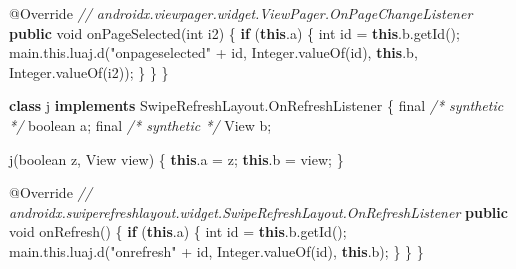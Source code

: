 \documentclass[
]{article}
\newenvironment{Shaded}{}{}
\newcommand{\AttributeTok}[1]{\textcolor[rgb]{0.49,0.56,0.16}{#1}}
\newcommand{\BuiltInTok}[1]{\textcolor[rgb]{0.00,0.50,0.00}{#1}}
\newcommand{\CommentTok}[1]{\textcolor[rgb]{0.38,0.63,0.69}{\textit{#1}}}
\newcommand{\ControlFlowTok}[1]{\textcolor[rgb]{0.00,0.44,0.13}{\textbf{#1}}}
\newcommand{\DataTypeTok}[1]{\textcolor[rgb]{0.56,0.13,0.00}{#1}}
\newcommand{\FunctionTok}[1]{\textcolor[rgb]{0.02,0.16,0.49}{#1}}
\newcommand{\KeywordTok}[1]{\textcolor[rgb]{0.00,0.44,0.13}{\textbf{#1}}}
\newcommand{\NormalTok}[1]{#1}
\newcommand{\OperatorTok}[1]{\textcolor[rgb]{0.40,0.40,0.40}{#1}}
\newcommand{\StringTok}[1]{\textcolor[rgb]{0.25,0.44,0.63}{#1}}
\begin{document}
\begin{Shaded}
\begin{Highlighting}[]
        \AttributeTok{@Override} \CommentTok{// androidx.viewpager.widget.ViewPager.OnPageChangeListener}
        \KeywordTok{public} \DataTypeTok{void} \FunctionTok{onPageSelected}\OperatorTok{(}\DataTypeTok{int}\NormalTok{ i2}\OperatorTok{)} \OperatorTok{\{}
            \ControlFlowTok{if} \OperatorTok{(}\KeywordTok{this}\OperatorTok{.}\FunctionTok{a}\OperatorTok{)} \OperatorTok{\{}
                \DataTypeTok{int}\NormalTok{ id }\OperatorTok{=} \KeywordTok{this}\OperatorTok{.}\FunctionTok{b}\OperatorTok{.}\FunctionTok{getId}\OperatorTok{();}
\NormalTok{                main}\OperatorTok{.}\FunctionTok{this}\OperatorTok{.}\FunctionTok{luaj}\OperatorTok{.}\FunctionTok{d}\OperatorTok{(}\StringTok{"onpageselected"} \OperatorTok{+}\NormalTok{ id}\OperatorTok{,} \BuiltInTok{Integer}\OperatorTok{.}\FunctionTok{valueOf}\OperatorTok{(}\NormalTok{id}\OperatorTok{),} \KeywordTok{this}\OperatorTok{.}\FunctionTok{b}\OperatorTok{,} \BuiltInTok{Integer}\OperatorTok{.}\FunctionTok{valueOf}\OperatorTok{(}\NormalTok{i2}\OperatorTok{));}
            \OperatorTok{\}}
        \OperatorTok{\}}
    \OperatorTok{\}}

    \KeywordTok{class}\NormalTok{ j }\KeywordTok{implements}\NormalTok{ SwipeRefreshLayout}\OperatorTok{.}\FunctionTok{OnRefreshListener} \OperatorTok{\{}
        \DataTypeTok{final} \CommentTok{/* synthetic */} \DataTypeTok{boolean}\NormalTok{ a}\OperatorTok{;}
        \DataTypeTok{final} \CommentTok{/* synthetic */} \BuiltInTok{View}\NormalTok{ b}\OperatorTok{;}

        \FunctionTok{j}\OperatorTok{(}\DataTypeTok{boolean}\NormalTok{ z}\OperatorTok{,} \BuiltInTok{View}\NormalTok{ view}\OperatorTok{)} \OperatorTok{\{}
            \KeywordTok{this}\OperatorTok{.}\FunctionTok{a} \OperatorTok{=}\NormalTok{ z}\OperatorTok{;}
            \KeywordTok{this}\OperatorTok{.}\FunctionTok{b} \OperatorTok{=}\NormalTok{ view}\OperatorTok{;}
        \OperatorTok{\}}

        \AttributeTok{@Override} \CommentTok{// androidx.swiperefreshlayout.widget.SwipeRefreshLayout.OnRefreshListener}
        \KeywordTok{public} \DataTypeTok{void} \FunctionTok{onRefresh}\OperatorTok{()} \OperatorTok{\{}
            \ControlFlowTok{if} \OperatorTok{(}\KeywordTok{this}\OperatorTok{.}\FunctionTok{a}\OperatorTok{)} \OperatorTok{\{}
                \DataTypeTok{int}\NormalTok{ id }\OperatorTok{=} \KeywordTok{this}\OperatorTok{.}\FunctionTok{b}\OperatorTok{.}\FunctionTok{getId}\OperatorTok{();}
\NormalTok{                main}\OperatorTok{.}\FunctionTok{this}\OperatorTok{.}\FunctionTok{luaj}\OperatorTok{.}\FunctionTok{d}\OperatorTok{(}\StringTok{"onrefresh"} \OperatorTok{+}\NormalTok{ id}\OperatorTok{,} \BuiltInTok{Integer}\OperatorTok{.}\FunctionTok{valueOf}\OperatorTok{(}\NormalTok{id}\OperatorTok{),} \KeywordTok{this}\OperatorTok{.}\FunctionTok{b}\OperatorTok{);}
            \OperatorTok{\}}
        \OperatorTok{\}}
    \OperatorTok{\}}


\end{Highlighting}
\end{Shaded}
\end{document}
